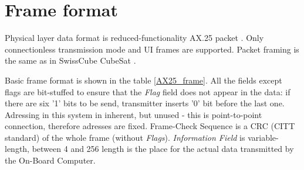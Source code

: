 
\section{Frame format}
Physical layer data format is reduced-functionality AX.25 packet \cite{AX25_standard}. Only connectionless transmission mode and UI frames are supported. Packet framing is the same as in SwissCube CubeSat \cite{SwissCube_AX25}.

Basic frame format is shown in the table \ref{AX25_frame}. All the fields except flags are bit-stuffed to ensure that the \textit{Flag} field does not appear in the data: if there are six '1' bits to be send, transmitter inserts '0' bit before the last one. Adressing in this system in inherent, but unused - this is point-to-point connection, therefore adresses are fixed. Frame-Check Sequence is a CRC (CITT standard) of the whole frame (without \textit{Flags}). \textit{Information Field} is variable-length, between \si{4} and \SI{256}{\byte} length is the place for the actual data transmitted by the On-Board Computer.

